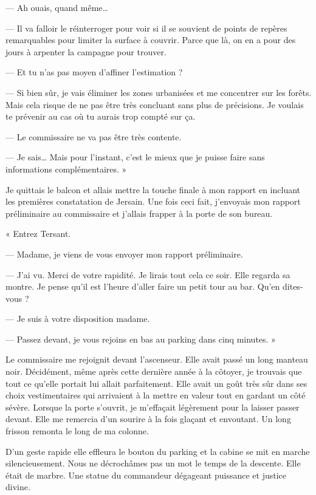 — Ah ouais, quand même…

— Il va falloir le réinterroger pour voir si il se souvient de points de repères remarquables pour limiter la surface à 
couvrir. Parce que là, on en a pour des jours à arpenter la campagne pour trouver. 

— Et tu n'as pas moyen d'affiner l'estimation ?

— Si bien sûr, je vais éliminer les zones urbanisées et me concentrer sur les forêts. Mais cela risque de ne pas être 
très concluant sans plus de précisions. Je voulais te prévenir au cas où tu aurais trop compté sur ça.

— Le commissaire ne va pas être très contente.

— Je sais… Mais pour l'instant, c'est le mieux que je puisse faire sans informations complémentaires. »

Je quittais le balcon et allais mettre la touche finale à mon rapport en incluant les premières constatation de 
Jersain. Une fois ceci fait, j'envoyais mon rapport préliminaire au commissaire et j'allais frapper à la porte de son 
bureau.

« Entrez Tersant.

— Madame, je viens de vous envoyer mon rapport préliminaire.

— J'ai vu. Merci de votre rapidité. Je lirais tout cela ce soir. Elle regarda sa montre. Je pense qu'il est l'heure 
d'aller faire un petit tour au bar. Qu'en dites-vous ?

— Je suis à votre disposition madame.

— Passez devant, je vous rejoins en bas au parking dans cinq minutes. »

Le commissaire me rejoignit devant l'ascenseur. Elle avait passé un long manteau noir. Décidément, même après cette 
dernière année à la côtoyer, je trouvais que tout ce qu'elle portait lui allait parfaitement. Elle avait un goût très 
sûr dans ses choix vestimentaires qui arrivaient à la mettre en valeur tout en gardant un côté sévère. Lorsque la porte 
s'ouvrit, je m'effaçait légèrement pour la laisser passer devant. Elle me remercia d'un sourire à la fois glaçant et 
envoutant. Un long frisson remonta le long de ma colonne.

D'un geste rapide elle effleura le bouton du parking et la cabine se mit en marche silencieusement. Nous ne décrochâmes 
pas un mot le temps de la descente. Elle était de marbre. Une statue du commandeur dégageant puissance et justice 
divine.


